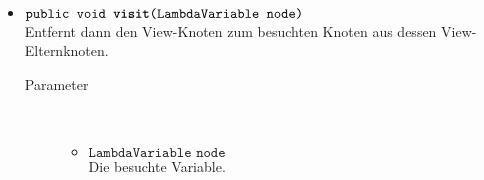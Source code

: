 \begin{description}
\begin{itemize}
		\item $\texttt{public void \textbf{visit}(LambdaVariable node)}$ \\ Entfernt dann den View-Knoten zum besuchten Knoten aus dessen View-Elternknoten.
		\begin{description}
			\item[Parameter] \hfill \\
			\vspace{-.8cm}
			\begin{itemize}
				\item $\texttt{LambdaVariable node}$ \\ Die besuchte Variable.
			\end{itemize}
		\end{description}
	\end{itemize}
\end{description}